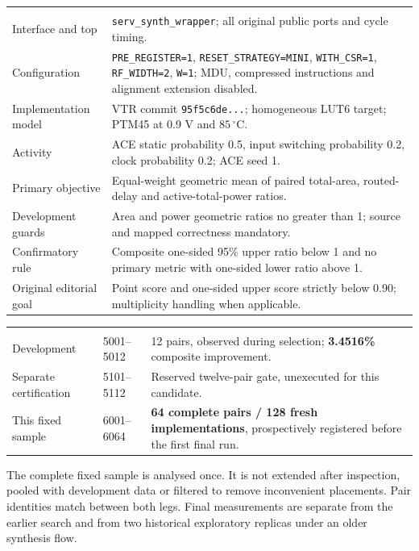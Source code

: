 {\small{}
\begin{tabularx}{\textwidth}{@{}P{39mm}Y@{}}
 &  \\
Interface and top & \texttt{serv\_synth\_wrapper}; all original public ports and cycle timing. \\
Configuration & \texttt{PRE\_REGISTER=1}, \texttt{RESET\_STRATEGY=MINI}, \texttt{WITH\_CSR=1}, \texttt{RF\_WIDTH=2}, \texttt{W=1}; MDU, compressed instructions and alignment extension disabled. \\
Implementation model & VTR commit \texttt{95f5c6de...}; homogeneous LUT6 target; PTM45 at 0.9 V and $85\,^{\circ}$C. \\
Activity & ACE static probability 0.5, input switching probability 0.2, clock probability 0.2; ACE seed 1. \\
Primary objective & Equal-weight geometric mean of paired total-area, routed-delay and active-total-power ratios. \\
Development guards & Area and power geometric ratios no greater than 1; source and mapped correctness mandatory. \\
Confirmatory rule & Composite one-sided 95\% upper ratio below 1 and no primary metric with one-sided lower ratio above 1. \\
Original editorial goal & Point score and one-sided upper score strictly below 0.90; multiplicity handling when applicable. \\
\end{tabularx}
}
\par
\vspace{4mm}
{\small{}
\begin{tabularx}{\textwidth}{@{}P{34mm}P{38mm}Y@{}}
 &  &  \\
Development & 5001--5012 & 12 pairs, observed during selection; \textbf{3.4516\%} composite improvement. \\
Separate certification & 5101--5112 & Reserved twelve-pair gate, unexecuted for this candidate. \\
This fixed sample & 6001--6064 & \textbf{64 complete pairs / 128 fresh implementations}, prospectively registered before the first final run. \\
\end{tabularx}
}
\par
The complete fixed sample is analysed once. It is not extended after inspection, pooled with development data or filtered to remove inconvenient placements. Pair identities match between both legs. Final measurements are separate from the earlier search and from two historical exploratory replicas under an older synthesis flow.

